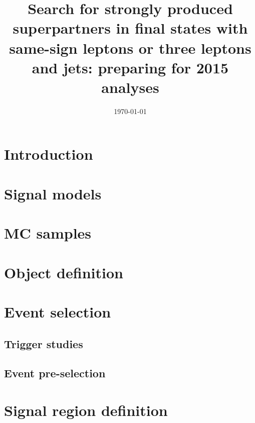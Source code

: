 \documentclass[11pt,a4paper]{atlasnote}
\title{Search for strongly produced superpartners in final states with same-sign leptons or three leptons and jets: preparing for 2015 analyses}
\date{\today}
\begin{document}
\tableofcontents
\clearpage


\section{Introduction}
\label{sec:intro}


\section{Signal models}
\label{sec:signal}


\section{MC samples}
\label{sec:samples}


\FloatBarrier

\section{Object definition}
\label{sec:objects}


\section{Event selection}
\label{sec:evtsel}

\subsection{Trigger studies}
\label{sec:trigger}



\subsection{Event pre-selection}
\label{sec:presel}



\section{Signal region definition}
\label{sec:sr}

\end{document}
